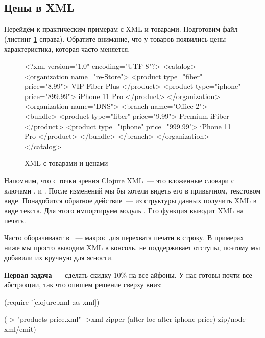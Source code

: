 \subsection{Цены в XML}

Перейдём к практическим примерам с XML и товарами. Подготовим файл
 (листинг \ref{fig:chart-xml-01} справа). Обратите
внимание, что у товаров появились цены~--- характеристика, которая часто
меняется.

\begin{figure}[ht!]

\begin{english}
  \begin{xml}
<?xml version="1.0" encoding="UTF-8"?>
<catalog>
  <organization name="re-Store">
    <product type="fiber" price="8.99">
      VIP Fiber Plus
    </product>
    <product type="iphone" price="899.99">
      iPhone 11 Pro
    </product>
  </organization>
  <organization name="DNS">
    <branch name="Office 2">
      <bundle>
        <product type="fiber" price="9.99">
          Premium iFiber
        </product>
        <product type="iphone" price="999.99">
          iPhone 11 Pro
        </product>
      </bundle>
    </branch>
  </organization>
</catalog>
  \end{xml}
\end{english}

\caption{XML с товарами и ценами}
\label{fig:chart-xml-01}

\end{figure}

Напомним, что с точки зрения Clojure XML~--- это вложенные словари с ключами
,  и . После изменений мы бы хотели видеть его в
привычном, текстовом виде. Понадобится обратное действие~--- из структуры данных
получить XML в виде текста. Для этого импортируем модуль . Его
функция  выводит XML на печать.

Часто  оборачивают в ~--- макрос для перехвата печати в
строку. В примерах ниже мы просто выводим XML в консоль.  не поддерживает
отступы, поэтому мы добавили их вручную для ясности.

\textbf{Первая задача}~--- сделать скидку 10\% на все айфоны. У нас готовы почти все
абстракции, так что опишем решение сверху вниз:

\begin{english}
  \begin{clojure}
(require '[clojure.xml :as xml])

(-> "products-price.xml"
    ->xml-zipper
    (alter-loc alter-iphone-price)
    zip/node
    xml/emit)
  \end{clojure}
\end{english}

